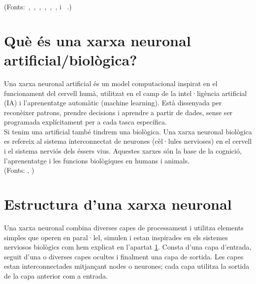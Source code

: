 (Fonts:~\cite{Universitat_oberta_catalunya},~\cite{Generalitat},~\cite{IBM_machine_learning},~\cite{Ultralytics},~\cite{bengio2012},~\cite{Ai_Act}, \cite{Algoritmes} i ~\cite{Unesco}.)

\section{Què és una xarxa neuronal artificial/biològica?}\label{sec:xarxa neuronal}

Una xarxa neuronal artificial és un model computacional inspirat en el funcionament del cervell humà, utilitzat en el camp de la intel·ligència artificial (IA) i l'aprenentatge automàtic (machine learning). Està dissenyada per reconèixer patrons, prendre decisions i aprendre a partir de dades, sense ser programada explícitament per a cada tasca específica.\\

Si tenim una artificial també tindrem una biològica. Una xarxa neuronal biològica es refereix al sistema interconnectat de neurones (cèl·lules nervioses) en el cervell i el sistema nerviós dels éssers vius. Aquestes xarxes són la base de la cognició, l'aprenentatge i les funcions biològiques en humans i animals.\\
(Fonts: \cite{UOC}, \cite{XarxaBiològica})
\section{Estructura d'una xarxa neuronal}\label{sec:3.6}

Una xarxa neuronal combina diverses capes de processament i utilitza elements simples que operen en paral·lel, simulen i estan inspirades en els sistemes nerviosos biològics com hem explicat en l'apartat \ref{sec:xarxa neuronal}. Consta d'una capa d'entrada, seguit d'una o diverses capes ocultes i finalment una capa de sortida. Les capes estan interconnectades mitjançant nodes o neurones; cada capa utilitza la sortida de la capa anterior com a entrada.

